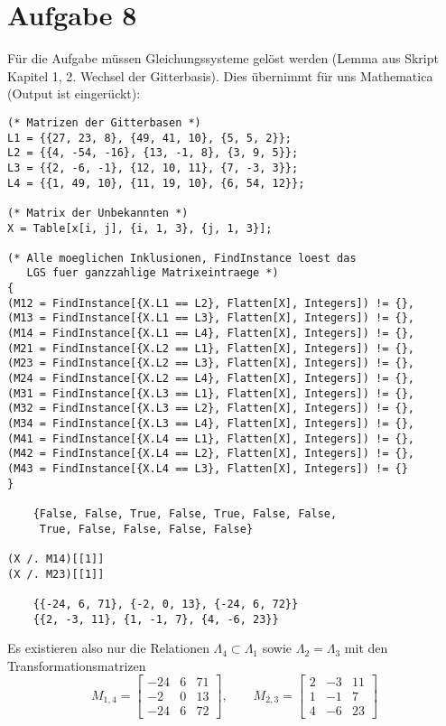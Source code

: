 \section*{Aufgabe 8}
Für die Aufgabe müssen Gleichungssysteme gelöst werden (Lemma aus Skript
Kapitel 1, 2. Wechsel der Gitterbasis). Dies übernimmt für uns Mathematica
(Output ist eingerückt):
\lstset{language=Mathematica}
\begin{lstlisting}
(* Matrizen der Gitterbasen *)
L1 = {{27, 23, 8}, {49, 41, 10}, {5, 5, 2}};
L2 = {{4, -54, -16}, {13, -1, 8}, {3, 9, 5}};
L3 = {{2, -6, -1}, {12, 10, 11}, {7, -3, 3}};
L4 = {{1, 49, 10}, {11, 19, 10}, {6, 54, 12}};

(* Matrix der Unbekannten *)
X = Table[x[i, j], {i, 1, 3}, {j, 1, 3}];

(* Alle moeglichen Inklusionen, FindInstance loest das 
   LGS fuer ganzzahlige Matrixeintraege *)
{
(M12 = FindInstance[{X.L1 == L2}, Flatten[X], Integers]) != {},
(M13 = FindInstance[{X.L1 == L3}, Flatten[X], Integers]) != {},
(M14 = FindInstance[{X.L1 == L4}, Flatten[X], Integers]) != {},
(M21 = FindInstance[{X.L2 == L1}, Flatten[X], Integers]) != {},
(M23 = FindInstance[{X.L2 == L3}, Flatten[X], Integers]) != {},
(M24 = FindInstance[{X.L2 == L4}, Flatten[X], Integers]) != {},
(M31 = FindInstance[{X.L3 == L1}, Flatten[X], Integers]) != {},
(M32 = FindInstance[{X.L3 == L2}, Flatten[X], Integers]) != {},
(M34 = FindInstance[{X.L3 == L4}, Flatten[X], Integers]) != {},
(M41 = FindInstance[{X.L4 == L1}, Flatten[X], Integers]) != {},
(M42 = FindInstance[{X.L4 == L2}, Flatten[X], Integers]) != {},
(M43 = FindInstance[{X.L4 == L3}, Flatten[X], Integers]) != {}
}

	{False, False, True, False, True, False, False, 
	 True, False, False, False, False}

(X /. M14)[[1]]
(X /. M23)[[1]]

	{{-24, 6, 71}, {-2, 0, 13}, {-24, 6, 72}}
	{{2, -3, 11}, {1, -1, 7}, {4, -6, 23}}
\end{lstlisting}
Es existieren also nur die Relationen $\Lambda_4 \subset \Lambda_1$ sowie
$\Lambda_2 = \Lambda_3$ mit den Transformationsmatrizen
\[ M_{1,4} = \begin{bmatrix}-24&6&71\\-2&0&13\\-24&6&72\end{bmatrix},\quad\quad
M_{2,3} = \begin{bmatrix}2&-3&11\\1&-1&7\\4&-6&23\end{bmatrix} \]


